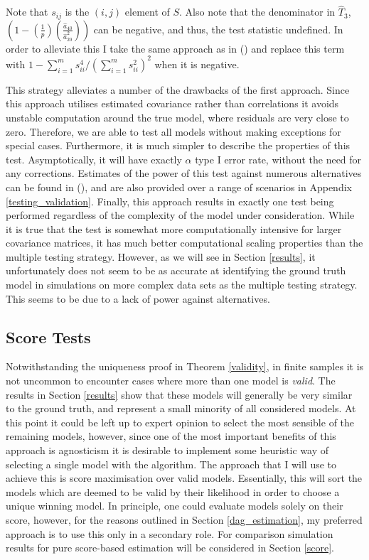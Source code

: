 \documentclass{article}
\begin{document}
Note that $s_{ij}$ is the $(i,j)$ element of $S$. Also note that the denominator in $\hat{T}_3$, $\left(1-\left(\frac{1}{p}\right)\left(\frac{\hat{a}_{40}}{\hat{a}^2_{20}}\right)\right)$ can be negative, and thus, the test statistic undefined. In order to alleviate this I take the same approach as in \citeauthor{wang2013necessary} (\citeyear{wang2013necessary}) and replace this term with $1-\sum_{i=1}^ms^4_{ii}/\left(\sum_{i=1}^ms^2_{ii}\right)^2$ when it is negative.

This strategy alleviates a number of the drawbacks of the first approach. Since this approach utilises estimated covariance rather than correlations it avoids unstable computation around the true model, where residuals are very close to zero. Therefore, we are able to test all models without making exceptions for special cases. Furthermore, it is much simpler to describe the properties of this test. Asymptotically, it will have exactly $\alpha$ type I error rate, without the need for any corrections. Estimates of the power of this test against numerous alternatives can be found in \citeauthor{wang2013necessary} (\citeyear{wang2013necessary}), and are also provided over a range of scenarios in Appendix \ref{testing_validation}. Finally, this approach results in exactly one test being performed regardless of the complexity of the model under consideration. While it is true that the test is somewhat more computationally intensive for larger covariance matrices, it has much better computational scaling properties than the multiple testing strategy. However, as we will see in Section \ref{results}, it unfortunately does not seem to be as accurate at identifying the ground truth model in simulations on more complex data sets as the multiple testing strategy. This seems to be due to a lack of power against alternatives.

\subsection{Score Tests} \label{scoretests}

Notwithstanding the uniqueness proof in Theorem \ref{validity}, in finite samples it is not uncommon to encounter cases where more than one model is \textit{valid}. The results in Section \ref{results} show that these models will generally be very similar to the ground truth, and represent a small minority of all considered models. At this point it could be left up to expert opinion to select the most sensible of the remaining models, however, since one of the most important benefits of this approach is agnosticism it is desirable to implement some heuristic way of selecting a single model with the algorithm. The approach that I will use to achieve this is score maximisation over valid models. Essentially, this will sort the models which are deemed to be valid by their likelihood in order to choose a unique winning model. In principle, one could evaluate models solely on their score, however, for the reasons outlined in Section \ref{dag_estimation}, my preferred approach is to use this only in a secondary role. For comparison simulation results for pure score-based estimation will be considered in Section \ref{score}.
\end{document}
